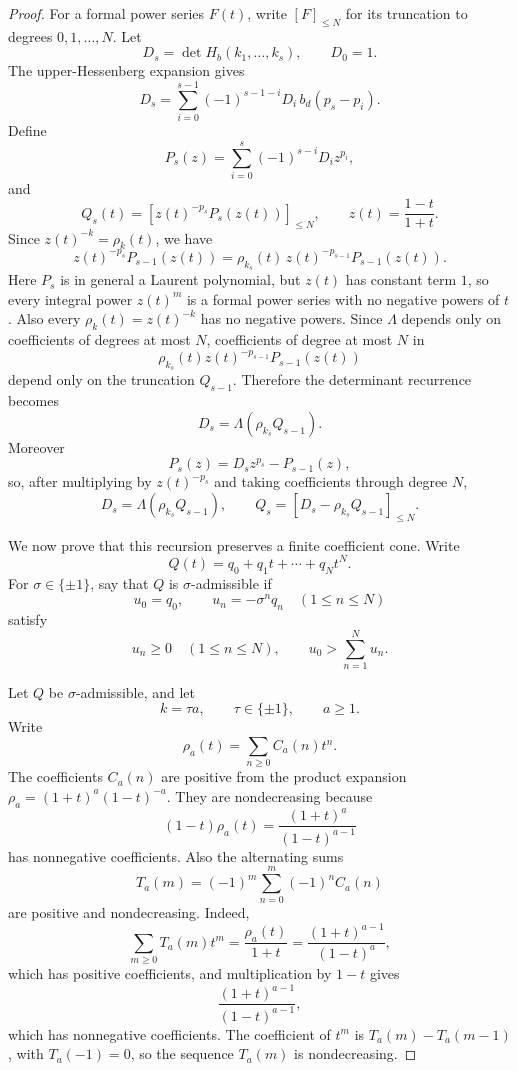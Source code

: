 \documentclass[a4paper,11pt]{amsart}
\theoremstyle{remark}
\numberwithin{equation}{section}
\begin{document}
\begin{proof}
For a formal power series \(F(t)\), write \([F]_{\le N}\) for its truncation to degrees \(0,1,\ldots,N\).  Let
\[
        D_s=\det H_b(k_1,\ldots,k_s),
        \qquad
        D_0=1.
\]
The upper-Hessenberg expansion gives
\begin{equation}\label{eq:hessenberg-rec}
        D_s
        =
        \sum_{i=0}^{s-1}(-1)^{s-1-i}D_i\,b_d(p_s-p_i).
\end{equation}
Define
\[
        P_s(z)=\sum_{i=0}^{s}(-1)^{s-i}D_i z^{p_i},
\]
and
\[
        Q_s(t)=\left[z(t)^{-p_s}P_s(z(t))\right]_{\le N},
        \qquad
        z(t)=\frac{1-t}{1+t}.
\]
Since \(z(t)^{-k}=\rho_k(t)\), we have
\[
        z(t)^{-p_s}P_{s-1}(z(t))
        =
        \rho_{k_s}(t)\,z(t)^{-p_{s-1}}P_{s-1}(z(t)).
\]
Here \(P_s\) is in general a Laurent polynomial, but \(z(t)\) has constant term \(1\), so every integral power \(z(t)^m\) is a formal power series with no negative powers of \(t\).  Also every \(\rho_k(t)=z(t)^{-k}\) has no negative powers.  Since \(\Lambda\) depends only on coefficients of degrees at most \(N\), coefficients of degree at most \(N\) in
\[
        \rho_{k_s}(t) z(t)^{-p_{s-1}}P_{s-1}(z(t))
\]
depend only on the truncation \(Q_{s-1}\).  Therefore the determinant recurrence becomes
\[
        D_s=\Lambda(\rho_{k_s}Q_{s-1}).
\]
Moreover
\[
        P_s(z)=D_s z^{p_s}-P_{s-1}(z),
\]
so, after multiplying by \(z(t)^{-p_s}\) and taking coefficients through degree \(N\),
\begin{equation}\label{eq:Q-recursion}
        D_s=\Lambda(\rho_{k_s}Q_{s-1}),
        \qquad
        Q_s=[D_s-\rho_{k_s}Q_{s-1}]_{\le N}.
\end{equation}

We now prove that this recursion preserves a finite coefficient cone.  Write
\[
        Q(t)=q_0+q_1t+\cdots+q_Nt^N.
\]
For \(\sigma\in\{\pm1\}\), say that \(Q\) is \(\sigma\)-admissible if
\[
        u_0=q_0,
        \qquad
        u_n=-\sigma^nq_n\quad(1\le n\le N)
\]
satisfy
\begin{equation}\label{eq:admissible}
        u_n\ge0\quad(1\le n\le N),
        \qquad
        u_0>\sum_{n=1}^{N}u_n.
\end{equation}

Let \(Q\) be \(\sigma\)-admissible, and let
\[
        k=\tau a,
        \qquad
        \tau\in\{\pm1\},
        \qquad
        a\ge1.
\]
Write
\[
        \rho_a(t)=\sum_{n\ge0}C_a(n)t^n.
\]
The coefficients \(C_a(n)\) are positive from the product expansion \(\rho_a=(1+t)^a(1-t)^{-a}\).  They are nondecreasing because
\[
        (1-t)\rho_a(t)=\frac{(1+t)^a}{(1-t)^{a-1}}
\]
has nonnegative coefficients.  Also the alternating sums
\[
        T_a(m)=(-1)^m\sum_{n=0}^{m}(-1)^nC_a(n)
\]
are positive and nondecreasing.  Indeed,
\[
        \sum_{m\ge0}T_a(m)t^m
        =
        \frac{\rho_a(t)}{1+t}
        =
        \frac{(1+t)^{a-1}}{(1-t)^a},
\]
which has positive coefficients, and multiplication by \(1-t\) gives
\[
        \frac{(1+t)^{a-1}}{(1-t)^{a-1}},
\]
which has nonnegative coefficients.  The coefficient of \(t^m\) is \(T_a(m)-T_a(m-1)\), with \(T_a(-1)=0\), so the sequence \(T_a(m)\) is nondecreasing.


\end{proof}
\end{document}
